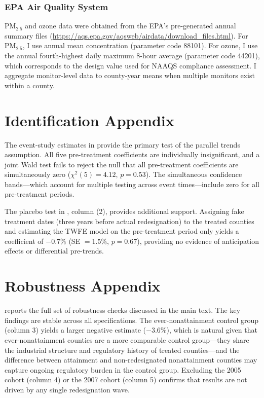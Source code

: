 \documentclass[12pt]{article}
\begin{document}
\subsubsection*{EPA Air Quality System} PM$_{2.5}$ and ozone data were obtained from the EPA's pre-generated annual summary files (\url{https://aqs.epa.gov/aqsweb/airdata/download_files.html}). For PM$_{2.5}$, I use annual mean concentration (parameter code 88101). For ozone, I use the annual fourth-highest daily maximum 8-hour average (parameter code 44201), which corresponds to the design value used for NAAQS compliance assessment. I aggregate monitor-level data to county-year means when multiple monitors exist within a county.

\section{Identification Appendix}
\label{app:identification}

The event-study estimates in  provide the primary test of the parallel trends assumption. All five pre-treatment coefficients are individually insignificant, and a joint Wald test fails to reject the null that all pre-treatment coefficients are simultaneously zero ($\chi^2(5) = 4.12$, $p = 0.53$). The simultaneous confidence bands---which account for multiple testing across event times---include zero for all pre-treatment periods.

The placebo test in , column (2), provides additional support. Assigning fake treatment dates (three years before actual redesignation) to the treated counties and estimating the TWFE model on the pre-treatment period only yields a coefficient of $-0.7\%$ (SE $= 1.5\%$, $p = 0.67$), providing no evidence of anticipation effects or differential pre-trends.

\section{Robustness Appendix}
\label{app:robustness}

 reports the full set of robustness checks discussed in the main text. The key findings are stable across all specifications. The ever-nonattainment control group (column 3) yields a larger negative estimate ($-3.6\%$), which is natural given that ever-nonattainment counties are a more comparable control group---they share the industrial structure and regulatory history of treated counties---and the difference between attainment and non-redesignated nonattainment counties may capture ongoing regulatory burden in the control group. Excluding the 2005 cohort (column 4) or the 2007 cohort (column 5) confirms that results are not driven by any single redesignation wave.
\end{document}
